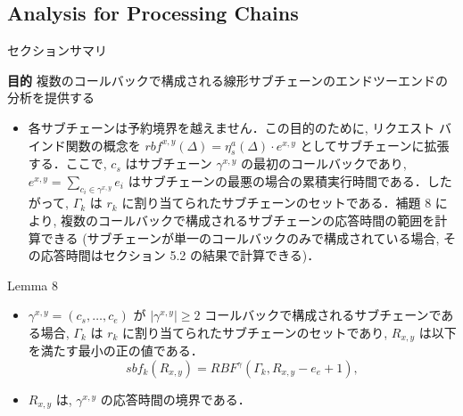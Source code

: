 \subsection{Analysis for Processing Chains}
\label{ssec: analysis for processing chains}

\begin{frame}{セクションサマリ}
    \begin{itembox}[l]{\textbf{目的}}
        複数のコールバックで構成される線形サブチェーンのエンドツーエンドの分析を提供する
    \end{itembox}
\end{frame}

\begin{frame}{}
    \begin{itemize}
        \item 各サブチェーンは予約境界を越えません．この目的のために, リクエスト バインド関数の概念を $r b f^{x, y}(\Delta)=\eta_{s}^{a}(\Delta) \cdot e^{x, y}$ としてサブチェーンに拡張する．ここで, $c_{s}$ はサブチェーン $\gamma^{x, y}$ の最初のコールバックであり, $e^{x, y}=\sum_{c_{i} \in \gamma^{x, y}} e_{i}$ はサブチェーンの最悪の場合の累積実行時間である．したがって, $\Gamma_{k}$ は $r_{k}$ に割り当てられたサブチェーンのセットである．補題 8 により, 複数のコールバックで構成されるサブチェーンの応答時間の範囲を計算できる (サブチェーンが単一のコールバックのみで構成されている場合, その応答時間はセクション 5.2 の結果で計算できる)．
    \end{itemize}
\end{frame}

\begin{frame}[label=lemma8]{Lemma 8}
    \begin{lemma}[]
        \begin{itemize}
            \item $\gamma^{x, y}=\left(c_{s}, \ldots, c_{e}\right)$ が $\left|\gamma^{x, y}\right| \geq 2$ コールバックで構成されるサブチェーンである場合, $\Gamma_{k}$ は $r_{k}$ に割り当てられたサブチェーンのセットであり, $R_{x, y}$ は以下を満たす最小の正の値である．
                  \begin{equation*}
                      s b f_{k}\left(R_{x, y}\right)=R B F^{\gamma}\left(\Gamma_{k}, R_{x, y}-e_{e}+1\right),
                  \end{equation*}

            \item $R_{x, y}$ は, $\gamma^{x, y}$ の応答時間の境界である．
        \end{itemize}
    \end{lemma}
\end{frame}

